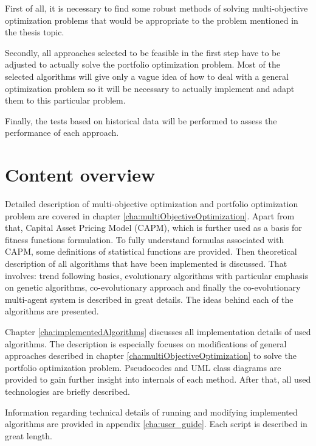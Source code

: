 First of all, it is necessary to find some robust methods of solving multi-objective optimization problems that would be appropriate to the problem mentioned in the thesis topic.

Secondly, all approaches selected to be feasible in the first step have to be adjusted to actually solve the portfolio optimization problem.
Most of the selected algorithms will give only a vague idea of how to deal with a general optimization problem so it will be necessary to actually
 implement and adapt them to this
 particular problem.

Finally, the tests based on historical data will be performed to assess the performance of each approach.


\section{Content overview}
\label{sec:zawartoscPracy}

Detailed description of multi-objective optimization and portfolio optimization problem are covered in chapter \ref{cha:multiObjectiveOptimization}.
Apart from that, Capital Asset Pricing Model (CAPM), which is further used as a basis for fitness functions formulation.
To fully understand formulas associated with CAPM, some definitions of statistical functions are provided.
Then theoretical description of all algorithms that have been implemented is discussed.
That involves: trend following basics, evolutionary algorithms with particular emphasis on genetic algorithms, co-evolutionary approach and finally
the co-evolutionary multi-agent system is described in great details.
The ideas behind each of the algorithms are presented.



Chapter \ref{cha:implementedAlgorithms} discusses all implementation details of used algorithms.
The description is especially focuses on modifications of general approaches described in chapter \ref{cha:multiObjectiveOptimization}
 to solve the portfolio optimization problem.
Pseudocodes and UML class diagrams are provided to gain further insight into internals of each method.
After that, all used technologies are briefly described.

Information regarding technical details of running and modifying implemented algorithms are provided in appendix \ref{cha:user_guide}.
Each script is described in great length.

